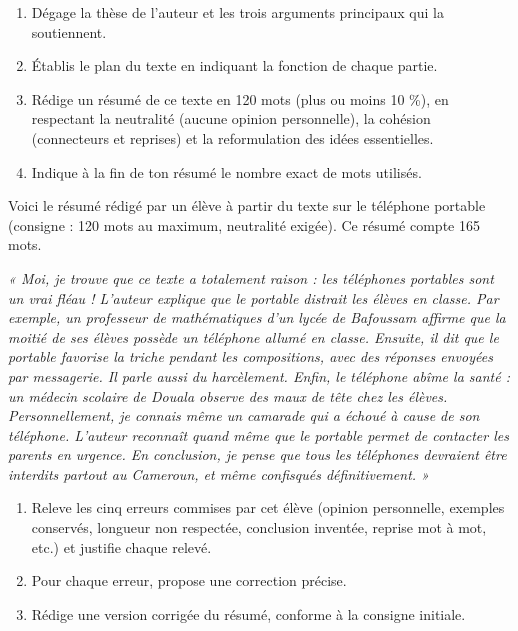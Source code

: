 \documentclass[11pt]{article}
\begin{document}
\begin{exercice}
\begin{enumerate}
\item Dégage la thèse de l'auteur et les trois arguments principaux qui la soutiennent.
\item Établis le plan du texte en indiquant la fonction de chaque partie.
\item Rédige un résumé de ce texte en 120 mots (plus ou moins 10 \%), en respectant la neutralité (aucune opinion personnelle), la cohésion (connecteurs et reprises) et la reformulation des idées essentielles.
\item Indique à la fin de ton résumé le nombre exact de mots utilisés.
\end{enumerate}
\end{exercice}

\begin{exercice}
Voici le résumé rédigé par un élève à partir du texte sur le téléphone portable (consigne : 120 mots au maximum, neutralité exigée). Ce résumé compte 165 mots.

\emph{« Moi, je trouve que ce texte a totalement raison : les téléphones portables sont un vrai fléau ! L'auteur explique que le portable distrait les élèves en classe. Par exemple, un professeur de mathématiques d'un lycée de Bafoussam affirme que la moitié de ses élèves possède un téléphone allumé en classe. Ensuite, il dit que le portable favorise la triche pendant les compositions, avec des réponses envoyées par messagerie. Il parle aussi du harcèlement. Enfin, le téléphone abîme la santé : un médecin scolaire de Douala observe des maux de tête chez les élèves. Personnellement, je connais même un camarade qui a échoué à cause de son téléphone. L'auteur reconnaît quand même que le portable permet de contacter les parents en urgence. En conclusion, je pense que tous les téléphones devraient être interdits partout au Cameroun, et même confisqués définitivement. »}

\begin{enumerate}
\item Releve les cinq erreurs commises par cet élève (opinion personnelle, exemples conservés, longueur non respectée, conclusion inventée, reprise mot à mot, etc.) et justifie chaque relevé.
\item Pour chaque erreur, propose une correction précise.
\item Rédige une version corrigée du résumé, conforme à la consigne initiale.
\end{enumerate}
\end{exercice}
\end{document}
